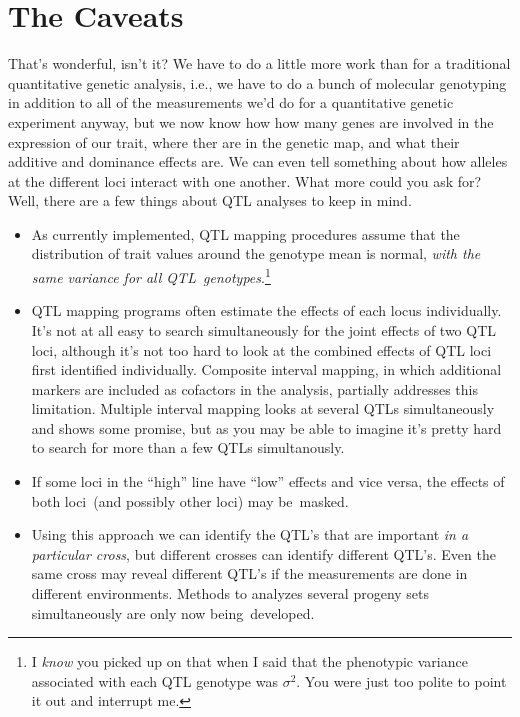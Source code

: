 \documentclass[12pt]{article}
\begin{document}
\section*{The Caveats}

That's wonderful, isn't it? We have to do a little more work than for
a traditional quantitative genetic analysis, i.e., we have to do a
bunch of molecular genotyping in addition to all of the measurements
we'd do for a quantitative genetic experiment anyway, but we now know
how how many genes are involved in the expression of our trait, where
ther are in the genetic map, and what their additive and dominance effects
are. We can even tell something about how alleles at the different
loci interact with one another. What more could you ask for? Well,
there are a few things about QTL analyses to keep in mind.

\begin{itemize}

\item As currently implemented, QTL mapping procedures assume that the
  distribution of trait values around the genotype mean is normal,
  {\it with the same variance for all QTL~genotypes}.\footnote{I {\it
      know\/} you picked up on that when I said that the phenotypic
    variance associated with each QTL genotype was $\sigma^2$. You
    were just too polite to point it out and interrupt me.}

\item QTL mapping programs often estimate the effects of each locus
  individually. It's not at all easy to search simultaneously for the
  joint effects of two QTL loci, although it's not too hard to look at
  the combined effects of QTL loci first identified
  individually. Composite interval mapping, in which additional
  markers are included as cofactors in the analysis, partially
  addresses this limitation. Multiple interval mapping looks at
  several QTLs simultaneously and shows some promise, but as you may
  be able to imagine it's pretty hard to search for more than a few
  QTLs simultanously.

\item If some loci in the ``high'' line have ``low'' effects and vice
  versa, the effects of both loci~(and possibly other loci) may
  be~masked.

\item Using this approach we can identify the QTL's that are important
  {\it in a particular cross}, but different crosses can identify
  different QTL's. Even the same cross may reveal different QTL's if
  the measurements are done in different environments. Methods to
  analyzes several progeny sets simultaneously are only now
  being~developed.

\end{itemize}




\ccLicense
\end{document}
